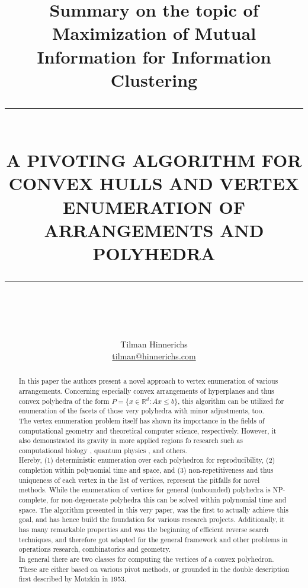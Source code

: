 \documentclass[]{article}
\title{Summary on the topic of Maximization of Mutual Information for Information Clustering}
\author{Tilman Hinnerichs\\
\href{mailto:tilman@hinnerichs.com}{tilman@hinnerichs.com}}
\date{}
\newcommand{\HRule}[1]{\rule{\linewidth}{#1}}
\begin{document}
	
	\title{ \normalsize
		\HRule{0.5pt} \\
		\LARGE \textbf{\uppercase{A Pivoting Algorithm for Convex Hulls and Vertex Enumeration of Arrangements and Polyhedra}}
		\HRule{0.5pt} \\ [0.5cm]
		\normalsize }

\maketitle
\begin{abstract}
	In this paper the authors present a novel approach to vertex enumeration of various arrangements. Concerning especially convex arrangements of hyperplanes and thus convex polyhedra of the form $P=\{x\in \mathbb{R}^d: Ax\leq b\}$, this algorithm can be utilized for enumeration of the facets of those very polyhedra with minor adjustments, too.\\
		
	The vertex enumeration problem itself has shown its importance in the fields of computational geometry and theoretical computer science, respectively. However, it also demonstrated its gravity in more applied regions fo research such as computational biology \cite{compBio}\cite{Acuna2012}\cite{Gagneur2004}, quantum physics \cite{BellEqu}, and others.\\
	
	Hereby, (1) deterministic enumeration over each polyhedron for reproducibility, (2) completion within polynomial  time and space, and (3) non-repetitiveness and thus uniqueness of each vertex in the list of vertices, represent the pitfalls for novel methods. While the enumeration of vertices for general (unbounded) polyhedra is NP-complete\cite{Khachiyan2008}, for non-degenerate polyhedra this can be solved within polynomial time and space. The algorithm presented in this very paper, was the first to actually achieve this goal, and has hence build the foundation for various research projects. Additionally, it has many remarkable properties and was the beginning of efficient reverse search techniques, and therefore got adapted for the general framework and other problems in operations research, combinatorics and geometry\cite{Avis1996}.\\
	
	In general there are two classes for computing the vertices of a convex polyhedron. These are either based on various pivot methods, or grounded in the \glqq double description\grqq{} first described by Motzkin\cite{Motzkin} in 1953.\\
	

\end{abstract}
\end{document}
